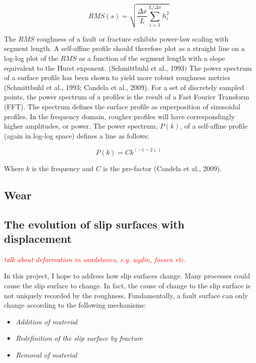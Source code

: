 \documentclass[12pt,a4paper]{article}
\begin{document}
\begin{equation}
RMS(s)=\sqrt{\dfrac{\Delta x}{L}\sum^{L/{\Delta x}}_{i=1} h^2_i}
\end{equation}


	The $RMS$ roughness of a fault or fracture exhibits power-law scaling with segment length. A self-affine profile should therefore plot as a straight line on a log-log plot of the $RMS$ as a function of the segment length with a slope equivalent to the Hurst exponent. (Schmittbuhl et al., 1993)
The power spectrum of a surface profile has been shown to yield more robust roughness metrics (Schmittbuhl et al., 1993; Candela et al., 2009). For a set of discretely sampled points, the power spectrum of a profiles is the result of a Fast Fourier Transform (FFT). The spectrum defines the surface profile as superposition of sinusoidal profiles.   In the frequency domain, rougher profiles will have correspondingly higher amplitudes, or power. The power spectrum, $P(k)$, of a self-affine profile (again in log-log space) defines a line as follows:

\begin{equation}
P(k) = Ck^{(-1-2\varsigma)}
\end{equation}

Where $k$ is the frequency and $C$ is the pre-factor (Candela et al., 2009). 


\subsection{Wear}

\subsection{The evolution of slip surfaces with displacement}

\textcolor{red}{\textit{talk about deformation in sandstones, e.g. aydin, fossen etc.}}

In this project, I hope to address how slip surfaces change. Many processes could cause the slip surface to change.   In fact, the cause of change to the slip surface is not uniquely recorded by the roughness. Fundamentally, a fault surface can only change according to the following mechanisms:
\begin{itemize}
	\item[] \textit{Addition of material}
	\item[] \textit{Redefinition of the slip surface by fracture}
	\item[] \textit{Removal of material}
\end{itemize}
	
\end{document}

